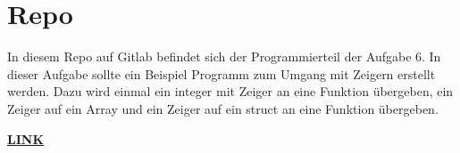 \section{Repo}
In diesem Repo auf Gitlab befindet sich der Programmierteil der Aufgabe 6. In dieser Aufgabe sollte ein Beispiel Programm zum Umgang mit Zeigern erstellt werden. Dazu wird einmal ein integer mit Zeiger an eine Funktion übergeben, ein Zeiger auf ein Array und ein Zeiger auf ein struct an eine Funktion übergeben.\par
\href{https://gitlab.thga.de/daniel.krueger/pruefung_sose_2023_aufgabe_6_pointer}{\textbf{LINK}}
